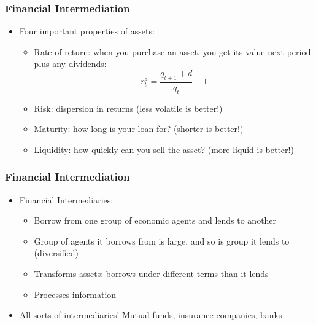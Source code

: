 \documentclass{beamer}
\begin{document}
\begin{frame}
\frametitle[alignment=center]{Financial Intermediation}
\begin{itemize}
\item Four important properties of assets:
\bigskip
\begin{itemize}
\item Rate of return:  when you purchase an asset, you get its value next period plus any dividends:
$$r_t^a=\frac{q_{t+1}+d}{q_t}-1$$
\item Risk:  dispersion in returns (less volatile is better!)
\bigskip
\item Maturity:  how long is your loan for? (shorter is better!)
\bigskip
\item Liquidity: how quickly can you sell the asset? (more liquid is better!)
\end{itemize}
\end{itemize}
\end{frame}

\begin{frame}
\frametitle[alignment=center]{Financial Intermediation}
\begin{itemize}
\item Financial Intermediaries:
\bigskip
\begin{itemize}
\item Borrow from one group of economic agents and lends to another
\bigskip
\item Group of agents it borrows from is large, and so is group it lends to (diversified)
\bigskip
\item Transforms assets:  borrows under different terms than it lends
\bigskip
\item Processes information
\end{itemize}
\item All sorts of intermediaries!  Mutual funds, insurance companies, banks
\end{itemize}
\end{frame}
\end{document}
